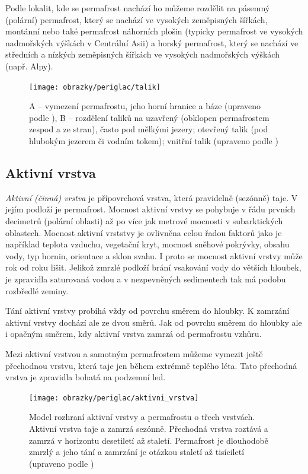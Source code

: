 Podle lokalit, kde se permafrost nachází ho můžeme rozdělit na pásemný (polární) permafrost, který se nachází ve vysokých zeměpisných šířkách, montánní nebo také permafrost náhorních plošin (typicky permafrost ve vysokých nadmořských výškách v Centrální Asii) a horský permafrost, který se nachází ve středních a nízkých zeměpisných šířkách ve vysokých nadmořských výškách (např. Alpy).

\begin{figure}[h]
	\centering
	\texttt{[image: obrazky/periglac/talik]}
	\caption{A -- vymezení permafrostu, jeho horní hranice a báze (upraveno podle \textcite{jrPermafrostRelatedEngineering1969}), B -- rozdělení taliků na uzavřený (obklopen permafrostem zespod a ze stran), často pod mělkými jezery; otevřený talik (pod hlubokým jezerem či vodním tokem); vnitřní talik (upraveno podle \textcite{demekObecnaGeomorfologie1987})}
	\label{fig:talik}
\end{figure}

\subsection{Aktivní vrstva}
\emph{Aktivní (činná) vrstva} je přípovrchová vrstva, která pravidelně (sezónně) taje. V jejím podloží je permafrost. Mocnost aktivní vrstvy se pohybuje v řádu prvních decimetrů (polární oblasti) až po více jak metrové mocnosti v subarktických oblastech. Mocnost aktivní vrststvy je ovlivněna celou řadou faktorů jako je například teplota vzduchu, vegetační kryt, mocnost sněhové pokrývky, obsahu vody, typ hornin, orientace a sklon svahu. I proto se mocnost aktivní vrstvy může rok od roku lišit. Jelikož zmrzlé podloží brání vsakování vody do větších hloubek, je zpravidla saturovaná vodou a v nezpevněných sedimentech tak má podobu rozbředlé zeminy. 

Tání aktivní vrstvy probíhá vždy od povrchu směrem do hloubky. K zamrzání aktivní vrstvy dochází ale ze dvou směrů. Jak od povrchu směrem do hloubky ale i opačným směrem, kdy aktivní vrstva zamrzá od permafrostu vzhůru. 

Mezi aktivní vrstvou a samotným permafrostem můžeme vymezit ještě přechodnou vrstvu, která taje jen během extrémně teplého léta. Tato přechodná vrstva je zpravidla bohatá na podzemní led.

\begin{figure}[h]
	\centering
	\texttt{[image: obrazky/periglac/aktivni\_vrstva]}
	\caption{Model rozhraní aktivní vrstvy a permafrostu o třech vrstvách. Aktivní vrstva taje a zamrzá sezónně. Přechodná vrstva roztává a zamrzá v horizontu desetiletí až staletí. Permafrost je dlouhodobě zmrzlý a jeho tání a zamrzání je otázkou staletí až tisíciletí (upraveno podle \textcite{frenchPeriglacialEnvironment2017})}
	\label{fig:aktivnivrstva}
\end{figure}


